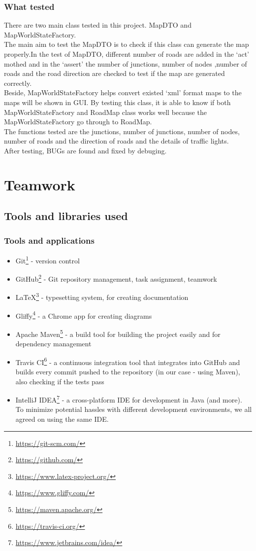 \documentclass[a4paper,12pt]{article}
\begin{document}
\subsubsection{What tested}
There are two main class tested in this project. MapDTO and MapWorldStateFactory.\\
The main aim to test the MapDTO is to check if this class can generate the map properly.In the test of MapDTO, different number of roads are added in the ‘act’ mothed and in the ‘assert’ the number of junctions, number of nodes ,number of roads and the road direction are checked to test if the map are generated correctly.\\
Beside, MapWorldStateFactory helps convert existed ‘xml’ format maps to the maps will be shown in GUI. By testing this class, it is able to know if both MapWorldStateFactory and RoadMap class works well because the MapWorldStateFactory go through to RoadMap.\\
The functions tested are the junctions, number of junctions, number of nodes, number of roads and the direction of roads and the details of traffic lights.\\
After testing, BUGs are found and fixed by debuging.\\
\section{Teamwork}

\subsection{Tools and libraries used}

\subsubsection*{Tools and applications}

\begin{itemize}
	\item Git\footnote{\url{https://git-scm.com/}} - version control
	\item GitHub\footnote{\url{https://github.com/}} - Git repository management, task assignment, teamwork
	\item \LaTeX\footnote{\url{https://www.latex-project.org/}} - typesetting system, for creating documentation
	\item Gliffy\footnote{\url{https://www.gliffy.com/}} - a Chrome app for creating diagrams
	\item Apache Maven\footnote{\url{https://maven.apache.org/}} - a build tool for building the project easily and for dependency management
	\item Travis CI\footnote{\url{https://travis-ci.org/}} - a continuous integration tool that integrates into GitHub and builds every commit pushed to the repository (in our case - using Maven), also checking if the tests pass
	\item IntelliJ IDEA\footnote{\url{https://www.jetbrains.com/idea/}} - a cross-platform IDE for development in Java (and more). To minimize potential hassles with different development environments, we all agreed on using the same IDE.
\end{itemize}
\end{document}

